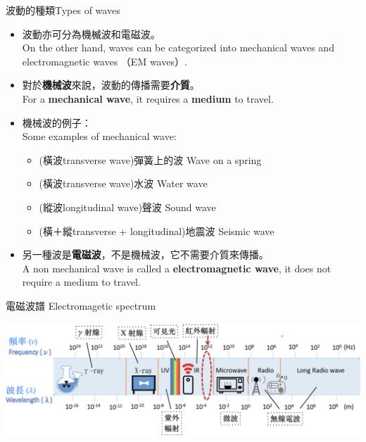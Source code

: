 \documentclass[beamer=true]{standalone}
\begin{document}
\begin{frame}{波動的種類Types of waves}
    \begin{itemize}
        \item 波動亦可分為機楲波和電磁波。\\On the other hand, waves can be categorized into mechanical waves and electromagnetic waves （EM waves）.
        \item 對於\textbf{機械波}來說，波動的傳播需要\textbf{介質}。\\For a \textbf{mechanical wave}, it requires a \textbf{medium} to travel.
        \item 機械波的例子：\\Some examples of mechanical wave:
              \begin{itemize}
                  \item (橫波transverse wave)彈簧上的波  Wave on a spring
                  \item (橫波transverse wave)水波  Water wave
                  \item (縱波longitudinal wave)聲波 Sound wave
                  \item (橫＋縱transverse + longitudinal)地震波 Seismic wave
              \end{itemize}
        \item 另一種波是\textbf{電磁波}，不是機械波，它不需要介質來傳播。\\A non mechanical wave is called a \textbf{electromagnetic wave}, it does not require a medium to travel.
    \end{itemize}
\end{frame}

\begin{frame}{電磁波譜 Electromagetic spectrum}
    \par{\par\centering\includegraphics[width=\textwidth]{./img/ch1_2024-05-06-18-39-52.png}\par}
\end{frame}
\end{document}
